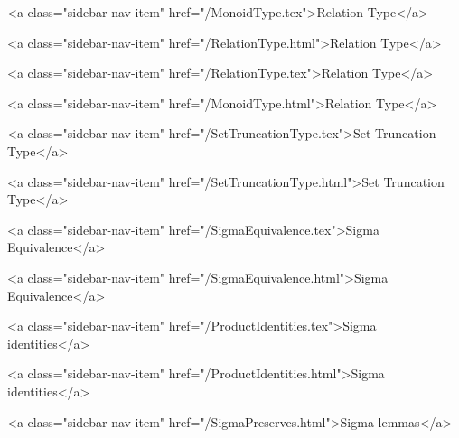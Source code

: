       
    
      
        
          <a class="sidebar-nav-item" href="/MonoidType.tex">Relation Type</a>
        
      
    
      
        
          <a class="sidebar-nav-item" href="/RelationType.html">Relation Type</a>
        
      
    
      
        
          <a class="sidebar-nav-item" href="/RelationType.tex">Relation Type</a>
        
      
    
      
        
          <a class="sidebar-nav-item" href="/MonoidType.html">Relation Type</a>
        
      
    
      
        
          <a class="sidebar-nav-item" href="/SetTruncationType.tex">Set Truncation Type</a>
        
      
    
      
        
          <a class="sidebar-nav-item" href="/SetTruncationType.html">Set Truncation Type</a>
        
      
    
      
        
          <a class="sidebar-nav-item" href="/SigmaEquivalence.tex">Sigma Equivalence</a>
        
      
    
      
        
          <a class="sidebar-nav-item" href="/SigmaEquivalence.html">Sigma Equivalence</a>
        
      
    
      
        
          <a class="sidebar-nav-item" href="/ProductIdentities.tex">Sigma identities</a>
        
      
    
      
        
          <a class="sidebar-nav-item" href="/ProductIdentities.html">Sigma identities</a>
        
      
    
      
        
          <a class="sidebar-nav-item" href="/SigmaPreserves.html">Sigma lemmas</a>
        
